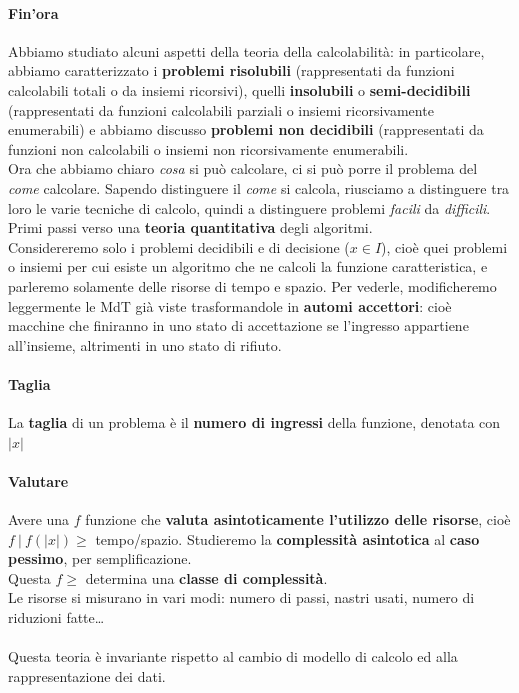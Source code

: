 \documentclass[10pt]{book}
\begin{document}
\paragraph{Fin'ora} Abbiamo studiato alcuni aspetti della teoria della calcolabilità: in particolare, abbiamo caratterizzato i \textbf{problemi risolubili} (rappresentati da funzioni calcolabili totali o da insiemi ricorsivi), quelli \textbf{insolubili} o \textbf{semi-decidibili} (rappresentati da funzioni calcolabili parziali o insiemi ricorsivamente enumerabili) e abbiamo discusso \textbf{problemi non decidibili} (rappresentati da funzioni non calcolabili o insiemi non ricorsivamente enumerabili.\\
Ora che abbiamo chiaro \textit{cosa} si può calcolare, ci si può porre il problema del \textit{come} calcolare. Sapendo distinguere il \textit{come} si calcola, riusciamo a distinguere tra loro le varie tecniche di calcolo, quindi a distinguere problemi \textit{facili} da \textit{difficili}. Primi passi verso una \textbf{teoria quantitativa} degli algoritmi.\\
Considereremo solo i problemi decidibili e di decisione ($x \in I$), cioè quei problemi o insiemi per cui esiste un algoritmo che ne calcoli la funzione caratteristica, e parleremo solamente delle risorse di tempo e spazio. Per vederle, modificheremo leggermente le MdT già viste trasformandole in \textbf{automi accettori}: cioè macchine che finiranno in uno stato di accettazione se l'ingresso appartiene all'insieme, altrimenti in uno stato di rifiuto.
\paragraph{Taglia} La \textbf{taglia} di un problema è il \textbf{numero di ingressi} della funzione, denotata con $|x|$
\paragraph{Valutare} Avere una $f$ funzione che \textbf{valuta asintoticamente l'utilizzo delle risorse}, cioè\\$f\:|\:f(|x|)\geq$ tempo/spazio. Studieremo la \textbf{complessità asintotica} al \textbf{caso pessimo}, per semplificazione.\\
Questa $f \geq$ determina una \textbf{classe di complessità}.\\
Le risorse si misurano in vari modi: numero di passi, nastri usati, numero di riduzioni fatte\ldots\\\\
Questa teoria è invariante rispetto al cambio di modello di calcolo ed alla rappresentazione dei dati.
\end{document}
